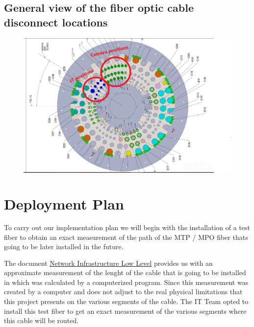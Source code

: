 \newpage

\subsection{General view of the fiber optic cable disconnect locations}

\begin{figure}
  \includegraphics[width=\textwidth]{images/22.png}
\end{figure}

\newpage

\section{Deployment Plan}

To carry out our implementation plan we will begin with the installation of a test fiber to obtain an exact measurement of the path of the MTP / MPO fiber thats going to be later installed in the future.

\vspace{5 mm}

The document \href{https://confluence.lsstcorp.org/display/IT/Network+Infrastructure+Low-Level+Design+LLD?preview=/139036736/140285500/Telescope-Camera%20Optical%20Fibers%20layout%20v3.pdf}{Network Infrastructure Low Level} provides us with an approximate measurement of the lenght of the cable that is going to be installed in which was calculated by a computerized program. Since this measurement was created by a computer and does not adjust to the real physical limitations that this project presents on the various segments of the cable. The IT Team opted to install this test fiber to get an exact measurement of the various segments where this cable will be routed.  

